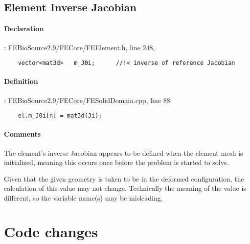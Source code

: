 \documentclass{article}
\begin{document}
\label{sec:varElementInverseJacobian}
\subsection*{Element Inverse Jacobian}

    \paragraph{Declaration}: FEBioSource2.9/FECore/FEElement.h, line 248, 
    \begin{lstlisting}
    vector<mat3d>	m_J0i;		//!< inverse of reference Jacobian 
    \end{lstlisting}

    \paragraph{Definition}: FEBioSource2.9/FECore/FESolidDomain.cpp, line 88
    \begin{lstlisting}
    el.m_J0i[n] = mat3d(Ji);
    \end{lstlisting}

    \paragraph{Comments}
    The element's inverse Jacobian appears to be defined when the element mesh is initialized, meaning this occurs once before the problem is started to solve.

    Given that the given geometry is taken to be in the deformed configuration, the calculation of this value may not change.
    Technically the meaning of the value is different, so the variable name(s) may be misleading.


\section*{Code changes}

\printbibliography
\end{document}
